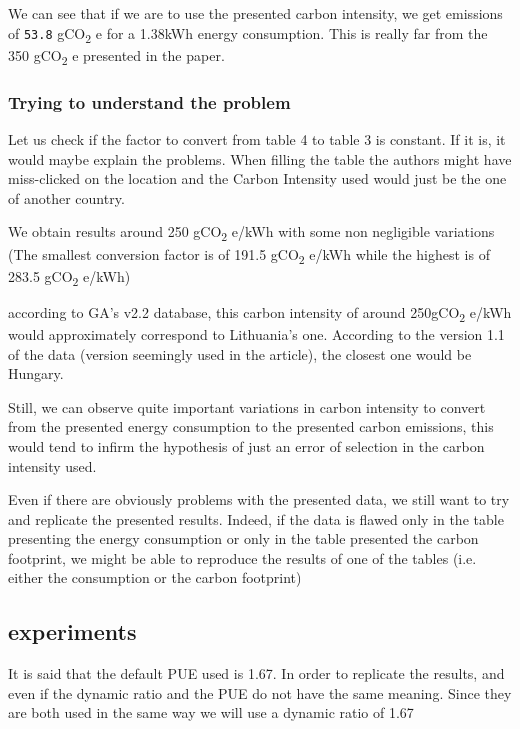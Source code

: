\documentclass[11pt]{article}
\begin{document}
We can see that if we are to use the presented carbon intensity, we
get emissions of 
\texttt{53.8} gCO\textsubscript{2} e for a 1.38kWh energy consumption. This is
really far from the 350 gCO\textsubscript{2} e presented in the paper.

\subsubsection{Trying to understand the problem}
\label{sec:orgab4e0bd}

Let us check if the factor to convert from table 4 to table 3 is
constant.
If it is, it would maybe explain the problems. When filling the table
the authors might have miss-clicked on the location and the Carbon
Intensity used would just be the one of another country.

We obtain results around 250 gCO\textsubscript{2} e/kWh with some non negligible
variations (The smallest conversion factor is of 191.5 gCO\textsubscript{2} e/kWh
while the highest is of 283.5 gCO\textsubscript{2} e/kWh)

according to GA's v2.2 database, this carbon intensity of around 250gCO\textsubscript{2}
e/kWh would approximately correspond to Lithuania's one. According to
the version 1.1 of the data (version seemingly used in the article),
the closest one would be Hungary.

Still, we can observe quite important variations in carbon intensity
to convert from the presented energy consumption to the presented
carbon emissions, this would tend to infirm the hypothesis of just an
error of selection in the carbon intensity used. 

Even if there are obviously problems with the presented data, we still
want to try and replicate the presented results. Indeed, if the data
is flawed only in the table presenting the energy consumption or only
in the table presented the carbon footprint, we might be able to
reproduce the results of one of the tables (i.e. either the
consumption or the carbon footprint)

\subsection{experiments}
\label{sec:org52e3eca}
It is said that the default \gls{PUE} used is 1.67. In order to replicate
the results, and even if the dynamic ratio and the \gls{PUE} do not have the
same meaning. Since they are both used in the same way we will use a
dynamic ratio of 1.67
\end{document}
